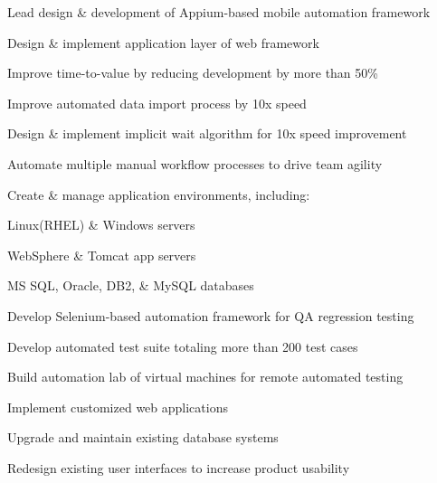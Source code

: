 \documentclass[]{resume}
\begin{document}
\begin{minipage}[t]{0.60\textwidth}
\begin{tightemize}
\item Lead design \& development of Appium-based mobile automation framework 
\item Design \& implement application layer of web framework \smallbreak
\begin{tightemize}
\item Improve time-to-value by reducing development by more than 50\%
\end{tightemize}

\item Improve automated data import process by 10x speed
\item Design \& implement implicit wait algorithm for 10x speed improvement
\item Automate multiple manual workflow processes to drive team agility
\item Create \& manage application environments, including:\smallbreak

\begin{tightemize}
 \item Linux(RHEL) \& Windows servers
 \item WebSphere \& Tomcat app servers
 \item MS SQL, Oracle, DB2, \& MySQL databases
\end{tightemize}


\end{tightemize}
\sectionsep

\begin{tightemize}
\item Develop Selenium-based automation framework for QA regression testing
\item Develop automated test suite totaling more than 200 test cases
\item Build automation lab of virtual machines for remote automated testing
\end{tightemize}
\sectionsep


\begin{tightemize}
\item Implement customized web applications
\item Upgrade and maintain existing database systems
\item Redesign existing user interfaces to increase product usability
\end{tightemize}
\sectionsep


\end{minipage}
\end{document}
